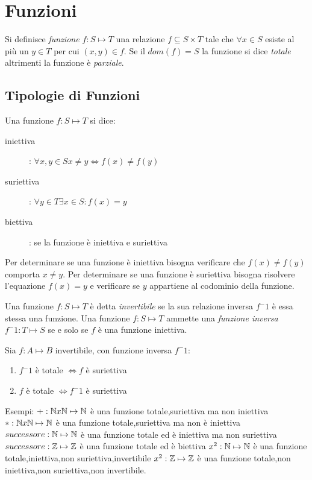 \chapter{Funzioni}
Si definisce \textit{funzione $f:S \mapsto T$} una relazione $f \subseteq S \times T$
tale che $\forall x \in S$ esiste al più un $y \in T$ per cui $(x,y) \in f$.\newline
Se il $dom(f) = S$ la funzione si dice \emph{totale} altrimenti la funzione è \emph{parziale}.

\section{Tipologie di Funzioni}
Una funzione $f:S \mapsto T$ si dice:
\begin{description}
    \item[iniettiva]: $\forall x,y \in S x \neq y \iff f(x) \neq f(y)$
    \item[suriettiva]: $\forall y \in T \exists x \in S : f(x) = y$
    \item[biettiva]: se la funzione è iniettiva e suriettiva
\end{description}
Per determinare se una funzione è iniettiva bisogna verificare che $f(x) \neq f(y)$
comporta $x \neq y$.
Per determinare se una funzione è suriettiva bisogna risolvere l'equazione $f(x) = y$
e verificare se $y$ appartiene al codominio della funzione.

Una funzione $f:S \mapsto T$ è detta \emph{invertibile} se la sua relazione inversa
$f ^ -1$ è essa stessa una funzione.\newline
Una funzione $f:S \mapsto T$ ammette una \emph{funzione inversa} $f ^ -1 :T \mapsto S$
se e solo se $f$ è una funzione iniettiva.

\begin{thm}
Sia $f:A \mapsto B$ invertibile, con funzione inversa $f ^ -1$:
\begin{enumerate}
    \item $f^-1$ è totale $\iff f$ è suriettiva
    \item $f$ è totale $\iff f^-1$ è suriettiva
\end{enumerate}
\end{thm}

Esempi:\newline
$+:\mathbb{N} x \mathbb{N} \mapsto \mathbb{N}$ è una funzione totale,suriettiva ma non iniettiva \newline
$*:\mathbb{N} x \mathbb{N} \mapsto \mathbb{N}$ è una funzione totale,suriettiva ma non è iniettiva \newline
$successore:\mathbb{N} \mapsto \mathbb{N}$ è una funzione totale ed è iniettiva ma non suriettiva \newline
$successore:\mathbb{Z} \mapsto \mathbb{Z}$ è una funzione totale ed è biettiva \newline
$x^2:\mathbb{N} \mapsto \mathbb{N}$ è una funzione totale,iniettiva,non suriettiva,invertibile \newline
$x^2:\mathbb{Z} \mapsto \mathbb{Z}$ è una funzione totale,non iniettiva,non suriettiva,non invertibile. \newline

